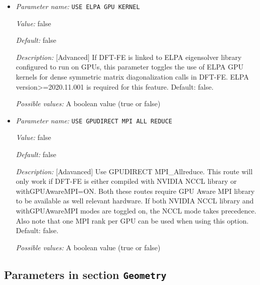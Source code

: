 \begin{itemize}
{\it Default:} false


{\it Description:} [Advanced] Use NCCL/RCCL for GPUDIRECT communications. Default: false.


{\it Possible values:} A boolean value (true or false)
\item {\it Parameter name:} {\tt USE ELPA GPU KERNEL}
\label{parameters:GPU/USE ELPA GPU KERNEL}
\label{parameters:GPU/USE_20ELPA_20GPU_20KERNEL}


{\it Value:} false


{\it Default:} false


{\it Description:} [Advanced] If DFT-FE is linked to ELPA eigensolver library configured to run on GPUs, this parameter toggles the use of ELPA GPU kernels for dense symmetric matrix diagonalization calls in DFT-FE. ELPA version>=2020.11.001 is required for this feature. Default: false.


{\it Possible values:} A boolean value (true or false)
\item {\it Parameter name:} {\tt USE GPUDIRECT MPI ALL REDUCE}
\label{parameters:GPU/USE GPUDIRECT MPI ALL REDUCE}
\label{parameters:GPU/USE_20GPUDIRECT_20MPI_20ALL_20REDUCE}


{\it Value:} false


{\it Default:} false


{\it Description:} [Adavanced] Use GPUDIRECT MPI\_Allreduce. This route will only work if DFT-FE is either compiled with NVIDIA NCCL library or withGPUAwareMPI=ON. Both these routes require GPU Aware MPI library to be available as well relevant hardware. If both NVIDIA NCCL library and withGPUAwareMPI modes are toggled on, the NCCL mode takes precedence. Also note that one MPI rank per GPU can be used when using this option. Default: false.


{\it Possible values:} A boolean value (true or false)
\end{itemize}

\subsection{Parameters in section \tt Geometry}
\label{parameters:Geometry}

